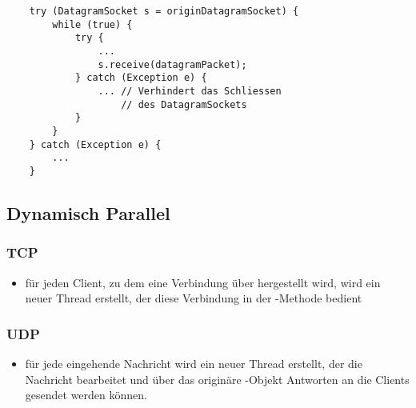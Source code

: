 \begin{verbatim}
    try (DatagramSocket s = originDatagramSocket) {
        while (true) {
            try {
                ...
                s.receive(datagramPacket);
            } catch (Exception e) {
                ... // Verhindert das Schliessen
                    // des DatagramSockets
            }
        }
    } catch (Exception e) {
        ...
    }
\end{verbatim}

\subsection{Dynamisch Parallel}


\subsubsection{TCP}

\begin{itemize}
    \item für jeden Client, zu dem eine Verbindung über  hergestellt wird, wird ein neuer Thread erstellt, der diese Verbindung in der -Methode
    bedient
\end{itemize}


\subsubsection{UDP}

\begin{itemize}
    \item für jede eingehende Nachricht wird ein neuer Thread erstellt, der die Nachricht bearbeitet und über das originäre -Objekt Antworten an die Clients gesendet werden können.
\end{itemize}
